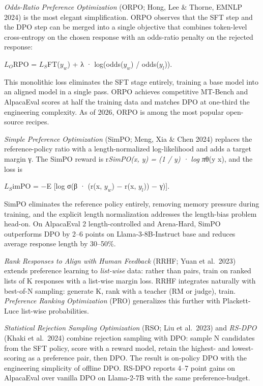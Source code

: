 \documentclass{article}
\begin{document}
\emph{Odds-Ratio Preference Optimization} (ORPO; Hong, Lee \& Thorne, EMNLP 2024) is the most elegant simplification. ORPO observes that the SFT step and the DPO step can be merged into a single objective that combines token-level cross-entropy on the chosen response with an odds-ratio penalty on the rejected response:

\(L_O\)RPO = \(L_S\)FT(\(y_w\)) + λ · log(odds(\(y_w\)) / odds(\(y_l\))).

This monolithic loss eliminates the SFT stage entirely, training a base model into an aligned model in a single pass. ORPO achieves competitive MT-Bench and AlpacaEval scores at half the training data and matches DPO at one-third the engineering complexity. As of 2026, ORPO is among the most popular open-source recipes.

\emph{Simple Preference Optimization} (SimPO; Meng, Xia \& Chen 2024) replaces the reference-policy ratio with a length-normalized log-likelihood and adds a target margin γ. The SimPO reward is r\emph{SimPO(x, y) = (1 / \textbar y\textbar) · log π}θ(y \textbar{} x), and the loss is

\(L_S\)imPO = −E {[}log σ(β · (r(x, \(y_w\)) − r(x, \(y_l\))) − γ){]}.

SimPO eliminates the reference policy entirely, removing memory pressure during training, and the explicit length normalization addresses the length-bias problem head-on. On AlpacaEval 2 length-controlled and Arena-Hard, SimPO outperforms DPO by 2--6 points on Llama-3-8B-Instruct base and reduces average response length by 30--50\%.

\emph{Rank Responses to Align with Human Feedback} (RRHF; Yuan et al.~2023) extends preference learning to \emph{list-wise} data: rather than pairs, train on ranked lists of K responses with a list-wise margin loss. RRHF integrates naturally with best-of-N sampling: generate K, rank with a teacher (RM or judge), train. \emph{Preference Ranking Optimization} (PRO) generalizes this further with Plackett-Luce list-wise probabilities.

\emph{Statistical Rejection Sampling Optimization} (RSO; Liu et al.~2023) and \emph{RS-DPO} (Khaki et al.~2024) combine rejection sampling with DPO: sample N candidates from the SFT policy, score with a reward model, retain the highest- and lowest-scoring as a preference pair, then DPO. The result is on-policy DPO with the engineering simplicity of offline DPO. RS-DPO reports 4--7 point gains on AlpacaEval over vanilla DPO on Llama-2-7B with the same preference-budget.
\end{document}

